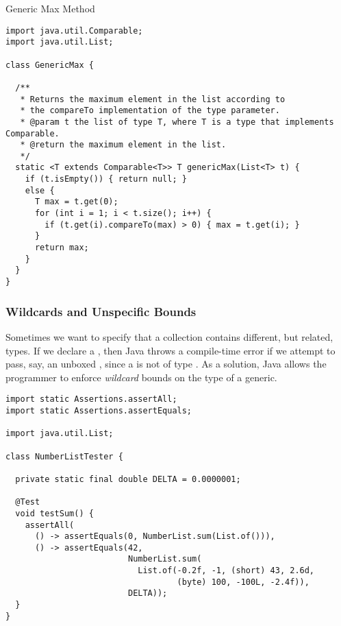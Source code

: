 \begin{cl}[]{Generic Max Method}
\begin{lstlisting}[language=MyJava]
import java.util.Comparable;
import java.util.List;

class GenericMax {
  
  /**
   * Returns the maximum element in the list according to 
   * the compareTo implementation of the type parameter.
   * @param t the list of type T, where T is a type that implements Comparable.
   * @return the maximum element in the list.
   */
  static <T extends Comparable<T>> T genericMax(List<T> t) {
    if (t.isEmpty()) { return null; }
    else {
      T max = t.get(0);
      for (int i = 1; i < t.size(); i++) {
        if (t.get(i).compareTo(max) > 0) { max = t.get(i); }
      }
      return max;
    }
  }
}
\end{lstlisting}
\end{cl}

\subsubsection*{Wildcards and Unspecific Bounds}
Sometimes we want to specify that a collection contains different, but related, types. If we declare a , then Java throws a compile-time error if we attempt to pass, say, an unboxed , since a  is not of type . As a solution, Java allows the programmer to enforce \textit{wildcard} bounds on the type of a generic. 


\begin{cl}[]{}
\begin{lstlisting}[language=MyJava]
import static Assertions.assertAll;
import static Assertions.assertEquals;

import java.util.List;

class NumberListTester {

  private static final double DELTA = 0.0000001;

  @Test
  void testSum() {
    assertAll(
      () -> assertEquals(0, NumberList.sum(List.of())),
      () -> assertEquals(42, 
                         NumberList.sum(
                           List.of(-0.2f, -1, (short) 43, 2.6d, 
                                   (byte) 100, -100L, -2.4f)),
                         DELTA));
  }
}
\end{lstlisting}
\end{cl}

